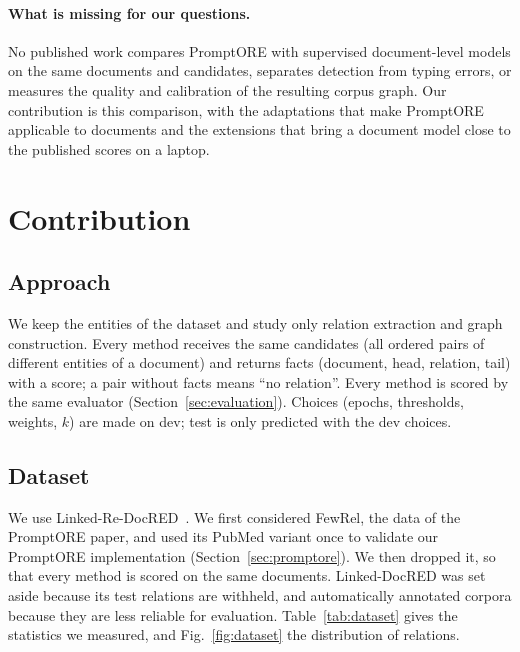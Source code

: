 \documentclass[pdflatex,sn-mathphys-num]{sn-jnl}
\begin{document}
\paragraph{What is missing for our questions.} No published work compares PromptORE with supervised document-level models on the same documents and candidates, separates detection from typing errors, or measures the quality and calibration of the resulting corpus graph. Our contribution is this comparison, with the adaptations that make PromptORE applicable to documents and the extensions that bring a document model close to the published scores on a laptop.

\section{Contribution}\label{sec:contribution}

\subsection{Approach}\label{sec:approach}

We keep the entities of the dataset and study only relation extraction and graph construction. Every method receives the same candidates (all ordered pairs of different entities of a document) and returns facts (document, head, relation, tail) with a score; a pair without facts means ``no relation''. Every method is scored by the same evaluator (Section~\ref{sec:evaluation}). Choices (epochs, thresholds, weights, $k$) are made on dev; test is only predicted with the dev choices.

\subsection{Dataset}\label{sec:dataset}

We use Linked-Re-DocRED~\cite{genest2023linkeddocred,tan2022redocred}. We first considered FewRel, the data of the PromptORE paper, and used its PubMed variant once to validate our PromptORE implementation (Section~\ref{sec:promptore}). We then dropped it, so that every method is scored on the same documents. Linked-DocRED was set aside because its test relations are withheld, and automatically annotated corpora because they are less reliable for evaluation. Table~\ref{tab:dataset} gives the statistics we measured, and Fig.~\ref{fig:dataset} the distribution of relations.
\end{document}
